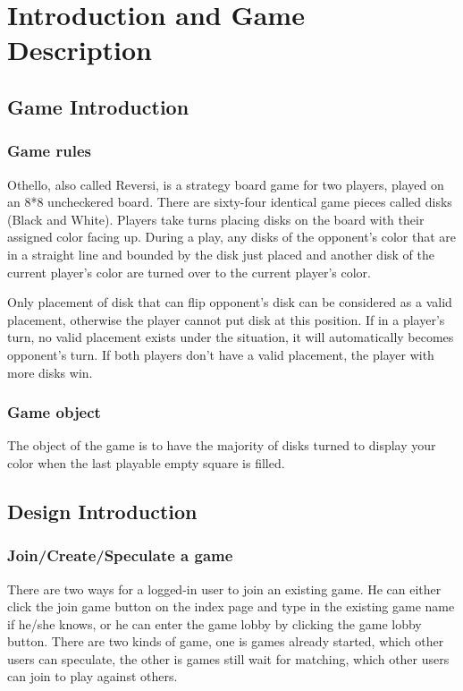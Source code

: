 \section{Introduction and Game Description}
\subsection{Game Introduction}
\subsubsection{Game rules}
Othello, also called Reversi, is a strategy board game for two players, played 
on an 8*8 uncheckered board. There are sixty-four identical game pieces called 
disks (Black and White). Players take turns placing disks on the board with 
their assigned color facing up. During a play, any disks of the opponent's color 
that are in a straight line and bounded by the disk just placed and another disk 
of the current player's color are turned over to the current player's color.

Only placement of disk that can flip opponent's disk can be considered as a valid placement, otherwise the player cannot put disk at this position. If in a player's turn, no valid placement exists under the situation, it will automatically becomes opponent's turn. If both players don't have a valid placement, the player with more disks win.

\subsubsection{Game object}
The object of the game is to have the majority of disks turned to display your 
color when the last playable empty square is filled.

\subsection{Design Introduction}

\subsubsection{Join/Create/Speculate a game} There are two ways for a logged-in 
user to join an existing game. He can either 
click the join game button on the index page and type in the existing game name
if he/she knows, or he can enter the game lobby by clicking the 
game lobby button. There are two kinds of game, one is games already started, 
which other users can speculate, the other is games still wait for matching, 
which other users can join to play against others. 

